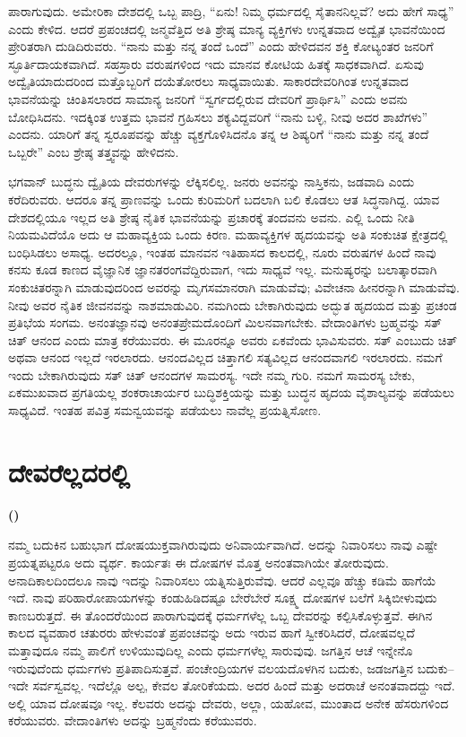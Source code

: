 ಪಾರಾಗುವುದು. ಅಮೇರಿಕಾ ದೇಶದಲ್ಲಿ ಒಬ್ಬ ಪಾದ್ರಿ, “ಏನು! ನಿಮ್ಮ ಧರ್ಮದಲ್ಲಿ ಸೈತಾನನಿಲ್ಲವೆ? ಅದು ಹೇಗೆ ಸಾಧ್ಯ” ಎಂದು ಕೇಳಿದ. ಆದರೆ ಪ್ರಪಂಚದಲ್ಲಿ ಜನ್ಮವೆತ್ತಿದ ಅತಿ ಶ್ರೇಷ್ಠ ಮಾನ್ಯ ವ್ಯಕ್ತಿಗಳು ಉನ್ನತವಾದ ಅದ್ವೈತ ಭಾವನೆಯಿಂದ ಪ್ರೇರಿತರಾಗಿ ದುಡಿದಿರುವರು. “ನಾನು ಮತ್ತು ನನ್ನ ತಂದೆ ಒಂದೆ” ಎಂದು ಹೇಳಿದವನ ಶಕ್ತಿ ಕೋಟ್ಯಂತರ ಜನರಿಗೆ ಸ್ಫೂರ್ತಿದಾಯಕವಾಗಿದೆ. ಸಹಸ್ರಾರು ವರುಷಗಳಿಂದ ಇದು ಮಾನವ ಕೋಟಿಯ ಹಿತಕ್ಕೆ ಸಾಧಕವಾಗಿದೆ. ಏಸುವು ಅದ್ವೈತಿಯಾದುದರಿಂದ ಮತ್ತೊಬ್ಬರಿಗೆ ದಯೆತೋರಲು ಸಾಧ್ಯವಾಯಿತು. ಸಾಕಾರದೇವರಿಗಿಂತ ಉನ್ನತವಾದ ಭಾವನೆಯನ್ನು ಚಿಂತಿಸಲಾರದ ಸಾಮಾನ್ಯ ಜನರಿಗೆ “ಸ್ವರ್ಗದಲ್ಲಿರುವ ದೇವರಿಗೆ ಪ್ರಾರ್ಥಿಸಿ” ಎಂದು ಅವನು ಬೋಧಿಸಿದನು. ಇದಕ್ಕಿಂತ ಉತ್ತಮ ಭಾವನೆ ಗ್ರಹಿಸಲು ಶಕ್ಯವಿದ್ದವರಿಗೆ “ನಾನು ಬಳ್ಳಿ, ನೀವು ಅದರ ಶಾಖೆಗಳು” ಎಂದನು. ಯಾರಿಗೆ ತನ್ನ ಸ್ವರೂಪವನ್ನು ಹೆಚ್ಚು ವ್ಯಕ್ತಗೊಳಿಸಿದನೊ ತನ್ನ ಆ ಶಿಷ್ಯರಿಗೆ “ನಾನು ಮತ್ತು ನನ್ನ ತಂದೆ ಒಬ್ಬರೇ” ಎಂಬ ಶ್ರೇಷ್ಠ ತತ್ತ್ವವನ್ನು ಹೇಳಿದನು.

\vskip 0.2cm 

ಭಗವಾನ್​ ಬುದ್ಧನು ದ್ವೈತಿಯ ದೇವರುಗಳನ್ನು ಲೆಕ್ಕಿಸಲಿಲ್ಲ. ಜನರು ಅವನನ್ನು ನಾಸ್ತಿಕನು, ಜಡವಾದಿ ಎಂದು ಕರೆದಿರುವರು. ಆದರೂ ತನ್ನ ಪ್ರಾಣವನ್ನು ಒಂದು ಕುರಿಮರಿಗೆ ಬದಲಾಗಿ ಬಲಿ ಕೊಡಲು ಆತ ಸಿದ್ಧನಾಗಿದ್ದ. ಯಾವ ದೇಶದಲ್ಲಿಯೂ ಇಲ್ಲದ ಅತಿ ಶ್ರೇಷ್ಠ ನೈತಿಕ ಭಾವನೆಯನ್ನು ಪ್ರಚಾರಕ್ಕೆ ತಂದವನು ಅವನು. ಎಲ್ಲಿ ಒಂದು ನೀತಿ ನಿಯಮವಿದೆಯೊ ಅದು ಆ ಮಹಾವ್ಯಕ್ತಿಯ ಒಂದು ಕಿರಣ. ಮಹಾವ್ಯಕ್ತಿಗಳ ಹೃದಯವನ್ನು ಅತಿ ಸಂಕುಚಿತ ಕ್ಷೇತ್ರದಲ್ಲಿ ಬಂಧಿಸಿಡಲು ಅಸಾಧ್ಯ. ಅದರಲ್ಲೂ, ಇಂತಹ ಮಾನವನ ಇತಿಹಾಸದ ಕಾಲದಲ್ಲಿ, ನೂರು ವರುಷಗಳ ಹಿಂದೆ ನಾವು ಕನಸು ಕೂಡ ಕಾಣದ ವೈಜ್ಞಾನಿಕ ಜ್ಞಾನತರಂಗವೆದ್ದಿರುವಾಗ, ಇದು ಸಾಧ್ಯವೆ ಇಲ್ಲ. ಮನುಷ್ಯರನ್ನು ಬಲಾತ್ಕಾರವಾಗಿ ಸಂಕುಚಿತರನ್ನಾಗಿ ಮಾಡುವುದರಿಂದ ಅವರನ್ನು ಮೃಗಸಮಾನರಾಗಿ ಮಾಡುವೆವು; ವಿವೇಚನಾ ಹೀನರನ್ನಾಗಿ ಮಾಡುವೆವು. ನೀವು ಅವರ ನೈತಿಕ ಜೀವನವನ್ನು ನಾಶಮಾಡುವಿರಿ. ನಮಗಿಂದು ಬೇಕಾಗಿರುವುದು ಅದ್ಭುತ ಹೃದಯದ ಮತ್ತು ಪ್ರಚಂಡ ಪ್ರತಿಭೆಯ ಸಂಗಮ. ಅನಂತಜ್ಞಾನವು ಅನಂತಪ್ರೇಮದೊಂದಿಗೆ ಮಿಲನವಾಗಬೇಕು. ವೇದಾಂತಿಗಳು ಬ್ರಹ್ಮವನ್ನು ಸತ್​ ಚಿತ್​ ಆನಂದ ಎಂದು ಮಾತ್ರ ಕರೆಯುವರು. ಈ ಮೂರನ್ನೂ ಅವರು ಏಕವೆಂದು ಭಾವಿಸುವರು. ಸತ್​ ಎಂಬುದು ಚಿತ್​ ಅಥವಾ ಆನಂದ ಇಲ್ಲದೆ ಇರಲಾರದು. ಆನಂದವಿಲ್ಲದ ಚಿತ್ತಾಗಲಿ ಸತ್ಯವಿಲ್ಲದ ಆನಂದವಾಗಲಿ ಇರಲಾರದು. ನಮಗೆ ಇಂದು ಬೇಕಾಗಿರುವುದು ಸತ್​ ಚಿತ್​ ಆನಂದಗಳ ಸಾಮರಸ್ಯ. ಇದೇ ನಮ್ಮ ಗುರಿ. ನಮಗೆ ಸಾಮರಸ್ಯ ಬೇಕು, ಏಕಮುಖವಾದ ಪ್ರಗತಿಯಲ್ಲ ಶಂಕರಾಚಾರ್ಯರ ಬುದ್ಧಿಶಕ್ತಿಯನ್ನು ಮತ್ತು ಬುದ್ಧನ ಹೃದಯ ವೈಶಾಲ್ಯವನ್ನು ಪಡೆಯಲು ಸಾಧ್ಯವಿದೆ. ಇಂತಹ ಪವಿತ್ರ ಸಮನ್ವಯವನ್ನು ಪಡೆಯಲು ನಾವೆಲ್ಲ ಪ್ರಯತ್ನಿಸೋಣ.

\delimiter

\chapter{ದೇವರೆಲ್ಲದರಲ್ಲಿ}%

\centerline{\textbf{(\fontsize{12pt}{14pt}\selectfont{ಲಂಡನ್ನಿನಲ್ಲಿ ೧೮೯೬ರ ಅಕ್ಟೋಬರ್​ ೨೭ರಂದು ನೀಡಿದ ಉಪನ್ಯಾಸ})}}

ನಮ್ಮ ಬದುಕಿನ ಬಹುಭಾಗ ದೋಷಯುಕ್ತವಾಗಿರುವುದು ಅನಿವಾರ್ಯವಾಗಿದೆ. ಅದನ್ನು ನಿವಾರಿಸಲು ನಾವು ಎಷ್ಟೇ ಪ್ರಯತ್ನಪಟ್ಟರೂ ಅದು ವ್ಯರ್ಥ. ಕಾರ್ಯತಃ ಈ ದೋಷಗಳ ಮೊತ್ತ ಅನಂತವಾಗಿಯೇ ತೋರುವುದು. ಅನಾದಿಕಾಲದಿಂದಲೂ ನಾವು ಇದನ್ನು ನಿವಾರಿಸಲು ಯತ್ನಿಸುತ್ತಿರುವೆವು. ಆದರೆ ಎಲ್ಲವೂ ಹೆಚ್ಚು ಕಡಿಮೆ ಹಾಗೆಯೆ ಇದೆ. ನಾವು ಪರಿಹಾರೋಪಾಯಗಳನ್ನು ಕಂಡುಹಿಡಿದಷ್ಟೂ ಬೇರೆಬೇರೆ ಸೂಕ್ಷ್ಮ ದೋಷಗಳ ಬಲೆಗೆ ಸಿಕ್ಕಿಬೀಳುವುದು ಕಾಣಬರುತ್ತದೆ. ಈ ತೊಂದರೆಯಿಂದ ಪಾರಾಗುವುದಕ್ಕೆ ಧರ್ಮಗಳೆಲ್ಲ ಒಬ್ಬ ದೇವರನ್ನು ಕಲ್ಪಿಸಿಕೊಳ್ಳುತ್ತವೆ. ಈಗಿನ ಕಾಲದ ವ್ಯವಹಾರ ಚತುರರು ಹೇಳುವಂತೆ ಪ್ರಪಂಚವನ್ನು ಅದು ಇರುವ ಹಾಗೆ ಸ್ವೀಕರಿಸಿದರೆ, ದೋಷವಲ್ಲದೆ ಮತ್ತಾವುದೂ ನಮ್ಮ ಪಾಲಿಗೆ ಉಳಿಯುವುದಿಲ್ಲ ಎಂದು ಧರ್ಮಗಳೆಲ್ಲ ಸಾರುವುವು. ಜಗತ್ತಿನ ಆಚೆ ಇನ್ನೇನೊ ಇರುವುದೆಂದು ಧರ್ಮಗಳು ಪ್ರತಿಪಾದಿಸುತ್ತವೆ. ಪಂಚೇಂದ್ರಿಯಗಳ ವಲಯದೊಳಗಿನ ಬದುಕು, ಜಡಜಗತ್ತಿನ ಬದುಕು–ಇದೇ ಸರ್ವಸ್ವವಲ್ಲ. ಇದೆಲ್ಲೊ ಅಲ್ಪ, ಕೇವಲ ತೋರಿಕೆಯದು. ಅದರ ಹಿಂದೆ ಮತ್ತು ಅದರಾಚೆ ಅನಂತವಾದದ್ದು ಇದೆ. ಅಲ್ಲಿ ಯಾವ ದೋಷವೂ ಇಲ್ಲ. ಕೆಲವರು ಅದನ್ನು ದೇವರು, ಅಲ್ಲಾ, ಯಹೋವ, ಮುಂತಾದ ಅನೇಕ ಹೆಸರುಗಳಿಂದ ಕರೆಯುವರು. ವೇದಾಂತಿಗಳು ಅದನ್ನು ಬ್ರಹ್ಮನೆಂದು ಕರೆಯುವರು.

